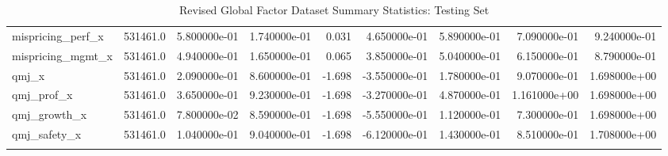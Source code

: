 \documentclass[12pt]{article}
\begin{document}
\begin{landscape}
\begin{longtable}{|l|r|r|r|r|r|r|r|r|}
mispricing\_perf\_x      &  531461.0 &  5.800000e-01 &  1.740000e-01 &       0.031 &  4.650000e-01 &  5.890000e-01 &  7.090000e-01 &  9.240000e-01 \\
mispricing\_mgmt\_x      &  531461.0 &  4.940000e-01 &  1.650000e-01 &       0.065 &  3.850000e-01 &  5.040000e-01 &  6.150000e-01 &  8.790000e-01 \\
qmj\_x                  &  531461.0 &  2.090000e-01 &  8.600000e-01 &      -1.698 & -3.550000e-01 &  1.780000e-01 &  9.070000e-01 &  1.698000e+00 \\
qmj\_prof\_x             &  531461.0 &  3.650000e-01 &  9.230000e-01 &      -1.698 & -3.270000e-01 &  4.870000e-01 &  1.161000e+00 &  1.698000e+00 \\
qmj\_growth\_x           &  531461.0 &  7.800000e-02 &  8.590000e-01 &      -1.698 & -5.550000e-01 &  1.120000e-01 &  7.300000e-01 &  1.698000e+00 \\
qmj\_safety\_x           &  531461.0 &  1.040000e-01 &  9.040000e-01 &      -1.698 & -6.120000e-01 &  1.430000e-01 &  8.510000e-01 &  1.708000e+00 \\
\bottomrule
\caption{Revised Global Factor Dataset Summary Statistics: Testing Set}
\label{table:ss-test}
\end{longtable}
\end{landscape}
\end{document}
